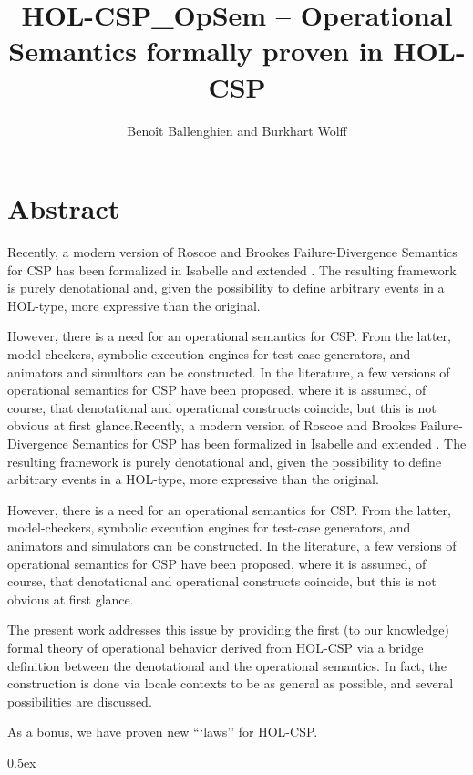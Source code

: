 \documentclass[11pt,a4paper]{book}
\begin{document}
\title{HOL-CSP\_OpSem -- Operational Semantics formally proven in HOL-CSP}
\author{Benoît Ballenghien and Burkhart Wolff}
\maketitle
\chapter*{Abstract}

   Recently, a modern version of Roscoe and Brookes \cite{brookes-roscoe85} 
   Failure-Divergence Semantics for CSP has been formalized in Isabelle \cite{HOL-CSP-AFP}
   and extended \cite{HOL-CSPM-AFP}. The resulting framework is purely denotational
   and, given the possibility to define arbitrary events in a HOL-type, more expressive 
   than the original.

   However, there is a need for an operational semantics for CSP. From the latter, model-checkers,
   symbolic execution engines for test-case generators, and animators and simultors can be 
   constructed. In the literature, a few versions of operational semantics
   for CSP have been proposed, where it is assumed, of course, that denotational and operational 
   constructs coincide, but this is not obvious at first glance.Recently, a modern version of Roscoe and Brookes \cite{brookes-roscoe85} 
   Failure-Divergence Semantics for CSP has been formalized in Isabelle \cite{HOL-CSP-AFP}
   and extended \cite{HOL-CSPM-AFP}. The resulting framework is purely denotational
   and, given the possibility to define arbitrary events in a HOL-type, more expressive 
   than the original.

   However, there is a need for an operational semantics for CSP. From the latter, model-checkers,
   symbolic execution engines for test-case generators, and animators and simulators can be 
   constructed. In the literature, a few versions of operational semantics
   for CSP have been proposed, where it is assumed, of course, that denotational and operational 
   constructs coincide, but this is not obvious at first glance.
   
   The present work addresses this issue by providing the first (to our knowledge) formal theory 
   of operational behavior derived from HOL-CSP via a bridge definition between the 
   denotational and the operational semantics.
   In fact, the construction is done via locale contexts to be as general as possible,
   and several possibilities are discussed.
   
   As a bonus, we have proven new ```laws'' for HOL-CSP.


\tableofcontents

\parindent 0pt\parskip 0.5ex





\end{document}
